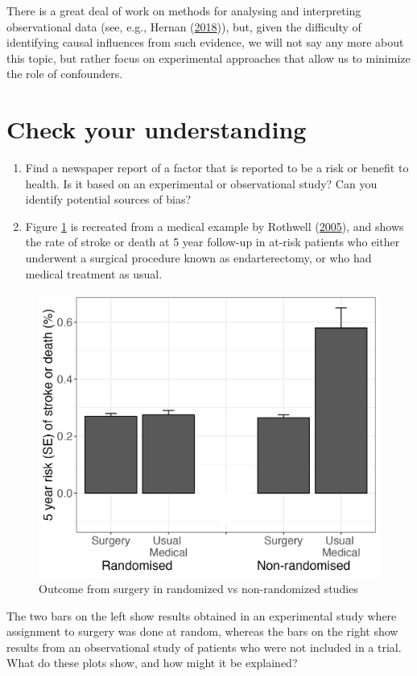 \documentclass{krantz}
\begin{document}
There is a great deal of work on methods for analysing and interpreting observational data (see, e.g., Hernan (\protect\hyperlink{ref-hernan2018}{2018})), but, given the difficulty of identifying causal influences from such evidence, we will not say any more about this topic, but rather focus on experimental approaches that allow us to minimize the role of confounders.

\hypertarget{check-your-understanding-1}{%
\section{Check your understanding}\label{check-your-understanding-1}}

\begin{enumerate}
\def\labelenumi{\arabic{enumi}.}
\item
  Find a newspaper report of a factor that is reported to be a risk or benefit to health. Is it based on an experimental or observational study? Can you identify potential sources of bias?
\item
  Figure \ref{fig:rothwellfig} is recreated from a medical example by Rothwell (\protect\hyperlink{ref-rothwell2005}{2005}), and shows the rate of stroke or death at 5 year follow-up in at-risk patients who either underwent a surgical procedure known as endarterectomy, or who had medical treatment as usual.
\end{enumerate}

\begin{figure}

{\centering \includegraphics[width=0.5\linewidth,height=0.5\textheight]{images_bw/rothwellplot} 

}

\caption{Outcome from surgery in randomized vs non-randomized studies}\label{fig:rothwellfig}
\end{figure}

The two bars on the left show results obtained in an experimental study where assignment to surgery was done at random, whereas the bars on the right show results from an observational study of patients who were not included in a trial. What do these plots show, and how might it be explained?
\end{document}
